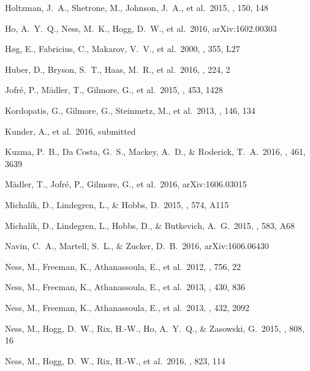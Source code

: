 \documentclass[preprint,trackchanges]{aastex}
\begin{document}
\begin{thebibliography}{dummy}
 Holtzman, J.~A., Shetrone, M., Johnson, J.~A., et al.\ 2015, \aj, 150, 148 

 Ho, A.~Y.~Q., Ness, M.~K., Hogg, D.~W., et al.\ 2016, arXiv:1602.00303 
 
 H{\o}g, E., Fabricius, C., Makarov, V.~V., et al.\ 2000, \aap, 355, L27 

 Huber, D., Bryson, S.~T., Haas, M.~R., et al.\ 2016, \apjs, 224, 2 

 Jofr{\'e}, P., M{\"a}dler, T., Gilmore, G., et al.\ 2015, \mnras, 453, 1428 

 Kordopatis, G., Gilmore, G., Steinmetz, M., et al.\ 2013, \aj, 146, 134 

 Kunder, A., et al.\ 2016, submitted

 Kuzma, P.~B., Da Costa, G.~S., Mackey, A.~D., \& Roderick, T.~A.\ 2016, \mnras, 461, 3639 

 M{\"a}dler, T., Jofr{\'e}, P., Gilmore, G., et al.\ 2016, arXiv:1606.03015 

 Michalik, D., Lindegren, L., \& Hobbs, D.\ 2015, \aap, 574, A115 

 Michalik, D., Lindegren, L., Hobbs, D., \& Butkevich, A.~G.\ 2015, \aap, 583, A68 

 Navin, C.~A., Martell, S.~L., \& Zucker, D.~B.\ 2016, arXiv:1606.06430 

 Ness, M., Freeman, K., Athanassoula, E., et al.\ 2012, \apj, 756, 22 

 Ness, M., Freeman, K., Athanassoula, E., et al.\ 2013, \mnras, 430, 836 

 Ness, M., Freeman, K., Athanassoula, E., et al.\ 2013, \mnras, 432, 2092 

 Ness, M., Hogg, D.~W., Rix, H.-W., Ho, A.~Y.~Q., \& Zasowski, G.\ 2015, \apj, 808, 16 

 Ness, M., Hogg, D.~W., Rix, H.-W., et al.\ 2016, \apj, 823, 114 


\end{thebibliography}
\end{document}
